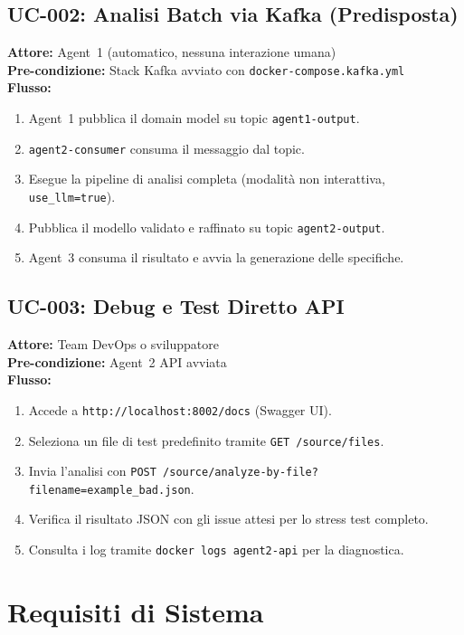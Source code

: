 \documentclass[12pt,a4paper]{report}
\begin{document}
\subsection{UC-002: Analisi Batch via Kafka (Predisposta)}

\textbf{Attore:} Agent~1 (automatico, nessuna interazione umana) \\
\textbf{Pre-condizione:} Stack Kafka avviato con \texttt{docker-compose.kafka.yml} \\
\textbf{Flusso:}
\begin{enumerate}
  \item Agent~1 pubblica il domain model su topic \texttt{agent1-output}.
  \item \texttt{agent2-consumer} consuma il messaggio dal topic.
  \item Esegue la pipeline di analisi completa (modalità non interattiva, \texttt{use\_llm=true}).
  \item Pubblica il modello validato e raffinato su topic \texttt{agent2-output}.
  \item Agent~3 consuma il risultato e avvia la generazione delle specifiche.
\end{enumerate}

\subsection{UC-003: Debug e Test Diretto API}

\textbf{Attore:} Team DevOps o sviluppatore \\
\textbf{Pre-condizione:} Agent~2 API avviata \\
\textbf{Flusso:}
\begin{enumerate}
  \item Accede a \texttt{http://localhost:8002/docs} (Swagger UI).
  \item Seleziona un file di test predefinito tramite \texttt{GET /source/files}.
  \item Invia l'analisi con \texttt{POST /source/analyze-by-file?filename=example\_bad.json}.
  \item Verifica il risultato JSON con gli issue attesi per lo stress test completo.
  \item Consulta i log tramite \texttt{docker logs agent2-api} per la diagnostica.
\end{enumerate}

\section{Requisiti di Sistema}
\end{document}
